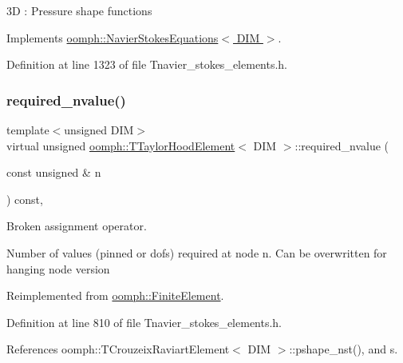 3D \+: Pressure shape functions 

Implements \hyperlink{classoomph_1_1NavierStokesEquations_a487030303b71da299aed3d4639a022ab}{oomph\+::\+Navier\+Stokes\+Equations$<$ D\+I\+M $>$}.



Definition at line 1323 of file Tnavier\+\_\+stokes\+\_\+elements.\+h.

\mbox{\label{classoomph_1_1TTaylorHoodElement_a43c139cf8d078cb943024d2c0673a02b}} 
\subsubsection{\texorpdfstring{required\+\_\+nvalue()}{required\_nvalue()}}
{\footnotesize\ttfamily template$<$unsigned D\+IM$>$ \\
virtual unsigned \hyperlink{classoomph_1_1TTaylorHoodElement}{oomph\+::\+T\+Taylor\+Hood\+Element}$<$ D\+IM $>$\+::required\+\_\+nvalue (\begin{DoxyParamCaption}\item[{const unsigned \&}]{n }\end{DoxyParamCaption}) const\hspace{0.3cm}{\ttfamily [inline]}, {\ttfamily [virtual]}}



Broken assignment operator. 

Number of values (pinned or dofs) required at node n. Can be overwritten for hanging node version 

Reimplemented from \hyperlink{classoomph_1_1FiniteElement_a56610c60d5bc2d7c27407a1455471b1a}{oomph\+::\+Finite\+Element}.



Definition at line 810 of file Tnavier\+\_\+stokes\+\_\+elements.\+h.



References oomph\+::\+T\+Crouzeix\+Raviart\+Element$<$ D\+I\+M $>$\+::pshape\+\_\+nst(), and s.

\mbox{\label{classoomph_1_1TTaylorHoodElement_a3c82a2ad750904e97a90e8e0fbe8e3c8}} 
